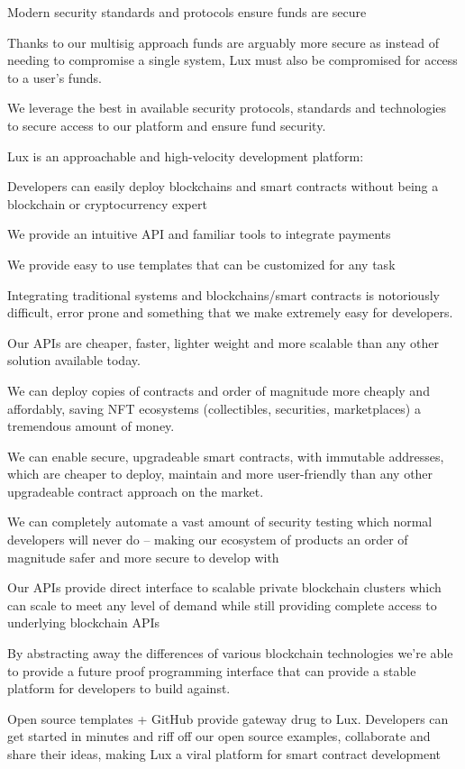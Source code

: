 \documentclass[11pt]{article}
\begin{document}
Modern security standards and protocols ensure funds are secure


Thanks to our multisig approach funds are arguably more secure as instead of needing to compromise a single system, Lux must also be compromised for access to a user's funds.


We leverage the best in available security protocols, standards and technologies to secure access to our platform and ensure fund security.


Lux is an approachable and high-velocity development platform:


Developers can easily deploy blockchains and smart contracts without being a blockchain or cryptocurrency expert


We provide an intuitive API and familiar tools to integrate payments


We provide easy to use templates that can be customized for any task


Integrating traditional systems and blockchains/smart contracts is notoriously difficult, error prone and something that we make extremely easy for developers.


Our APIs are cheaper, faster, lighter weight and more scalable than any other solution available today.


We can deploy copies of contracts and order of magnitude more cheaply and affordably, saving NFT ecosystems (collectibles, securities, marketplaces) a tremendous amount of money.


We can enable secure, upgradeable smart contracts, with immutable addresses, which are cheaper to deploy, maintain and more user-friendly than any other upgradeable contract approach on the market.


We can completely automate a vast amount of security testing which normal developers will never do -- making our ecosystem of products an order of magnitude safer and more secure to develop with


Our APIs provide direct interface to scalable private blockchain clusters which can scale to meet any level of demand while still providing complete access to underlying blockchain APIs


By abstracting away the differences of various blockchain technologies we're able to provide a future proof programming interface that can provide a stable platform for developers to build against.


Open source templates + GitHub provide gateway drug to Lux. Developers can get started in minutes and riff off our open source examples, collaborate and share their ideas, making Lux a viral platform for smart contract development
\end{document}
